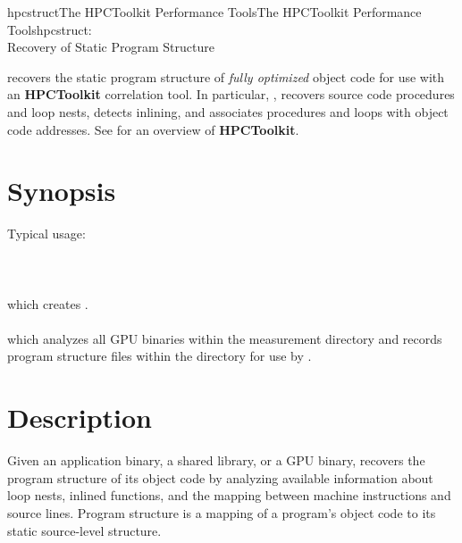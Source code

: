 \documentclass[english]{article}
\begin{document}
\begin{Name}{1}{hpcstruct}{The HPCToolkit Performance Tools}{The HPCToolkit Performance Tools}{hpcstruct:\\ Recovery of Static Program Structure}

 recovers the static program structure of \emph{fully optimized} object code for use with an \textbf{HPCToolkit} correlation tool.
In particular, , recovers source code procedures and loop nests, detects inlining, and associates procedures and loops with object code addresses.
See  for an overview of \textbf{HPCToolkit}.

\end{Name}

\section{Synopsis}

  
  

Typical usage:\\ \\
\SP\SP\SP{}  \\ \\
which creates .
\SP\SP\SP{}  \\ \\
which analyzes all GPU binaries within the measurement directory and records 
program structure files within the directory for use by .

\section{Description}

Given an application binary, a shared library, or a GPU binary, 
recovers the program structure of its object code by analyzing available information
about loop nests, inlined functions, and the mapping between machine instructions and 
source lines.  Program structure is a
mapping of a program's object code to its static source-level structure.
\end{document}
